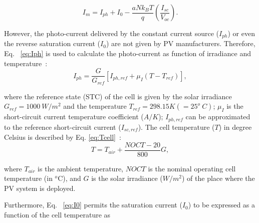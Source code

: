 \begin{equation}
\label{eq:Imfinal}
I_{m} = I_{ph} + I_{0} - \dfrac{aNk_{B}T}{q} \left( \dfrac{I_{sc}}{V_{oc}} \right).  
\end{equation}

%
%
However, the photo-current delivered by the constant current source ($I_{ph}$) or even the reverse saturation current ($ I_{0} $) are not given by PV manufacturers. Therefore, Eq. ~\eqref{eq:Iph} is used to calculate the photo-current as function of irradiance and temperature~\cite{Villalva}:
\begin{equation}
\label{eq:Iph}
I_{ph}=\dfrac{G}{G_{ref}} \left[ I_{ph,ref} + \mu_{I} \left( T-T_{ref} \right)    \right], 
\end{equation}

\noindent where the reference state (STC) of the cell is given by the solar irradiance $ G_{ref}=1000\:W/m^{2} $ and the temperature $ T_{ref}=298.15 K (=25^{o}\:C) $; $ \mu_{I} $ is the short-circuit current temperature coefficient ($A/K$); %
$ I_{ph,ref} $ can be approximated to the reference short-circuit current ($ I_{sc,ref} $)\cite{Villalva}.
The cell temperature ($ T $) in degree Celsius is described by Eq. \ref{eq:Tcell}~\cite{Ross}:
\begin{equation}
\label{eq:Tcell}
T = T_{air} + \dfrac{NOCT-20}{800}G,
\end{equation}

\noindent where $ T_{air} $ is the ambient temperature, $NOCT$ is the nominal operating cell temperature (in $^{o}$C), and $G$ is the solar irradiance ($ W/m^{2} $) of the place where the PV system is deployed.

Furthermore, Eq. ~\eqref{eq:I0} permits the saturation current ($ I_{0} $) to be expressed as a function of the cell temperature as~\cite{Villalva} 

